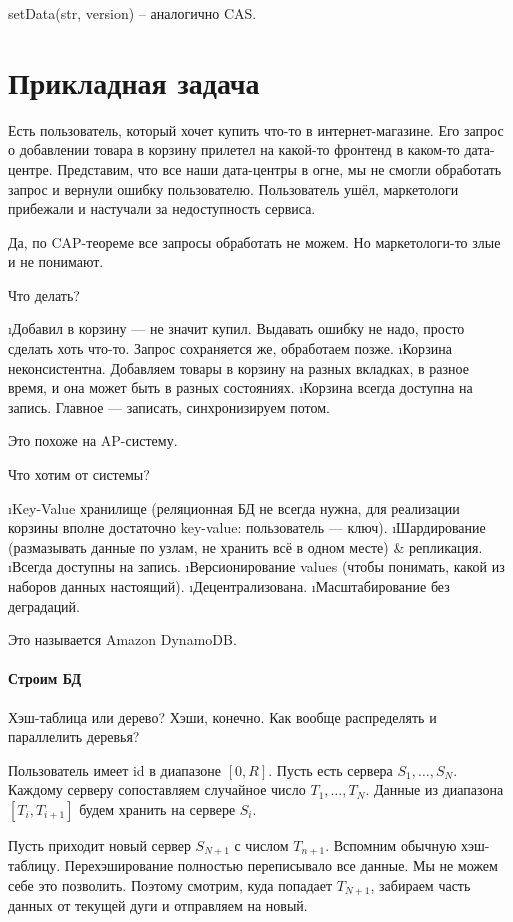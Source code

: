 \begin{enumarate}
setData(str, version) -- аналогично CAS.

\section{Прикладная задача}
Есть пользователь, который хочет купить что-то в интернет-магазине. Его запрос о добавлении товара в корзину прилетел на какой-то фронтенд в каком-то дата-центре. Представим, что все наши дата-центры в огне, мы не смогли обработать запрос и вернули ошибку пользователю. Пользователь ушёл, маркетологи прибежали и настучали за недоступность сервиса. 

Да, по CAP-теореме все запросы обработать не можем. Но маркетологи-то злые и не понимают.

Что делать?
\begin{enumerate}
\i Добавил в корзину --- не значит купил. Выдавать ошибку не надо, просто сделать хоть что-то. Запрос сохраняется же, обработаем позже.
\i Корзина неконсистентна. Добавляем товары в корзину на разных вкладках, в разное время, и она может быть в разных состояниях.
\i Корзина всегда доступна на запись. Главное --- записать, синхронизируем потом.
\end{enumerate}
Это похоже на AP-систему.

Что хотим от системы?
\begin{enumerate}
\i Key-Value хранилище (реляционная БД не всегда нужна, для реализации корзины вполне достаточно key-value: пользователь --- ключ).
\i Шардирование (размазывать данные по узлам, не хранить всё в одном месте) \& репликация.
\i Всегда доступны на запись.
\i Версионирование values (чтобы понимать, какой из наборов данных настоящий).
\i Децентрализована.
\i Масштабирование без деградаций.
\end{enumerate}

Это называется Amazon DynamoDB.

\paragraph{Строим БД}

Хэш-таблица или дерево? Хэши, конечно. Как вообще распределять и параллелить деревья?

Пользователь имеет id в диапазоне $[0, R]$. Пусть есть сервера $S_1, \dots, S_N$. Каждому серверу сопоставляем случайное число $T_1, \dots, T_N$.
Данные из диапазона $[T_i, T_{i+1}]$ будем хранить на сервере $S_i$.

Пусть приходит новый сервер $S_{N+1}$ с числом $T_{n+1}$. Вспомним обычную хэш-таблицу. Перехэширование полностью переписывало все данные. Мы не можем себе это позволить. Поэтому смотрим, куда попадает $T_{N+1}$, забираем часть данных от текущей дуги и отправляем на новый.



\end{enumarate}
